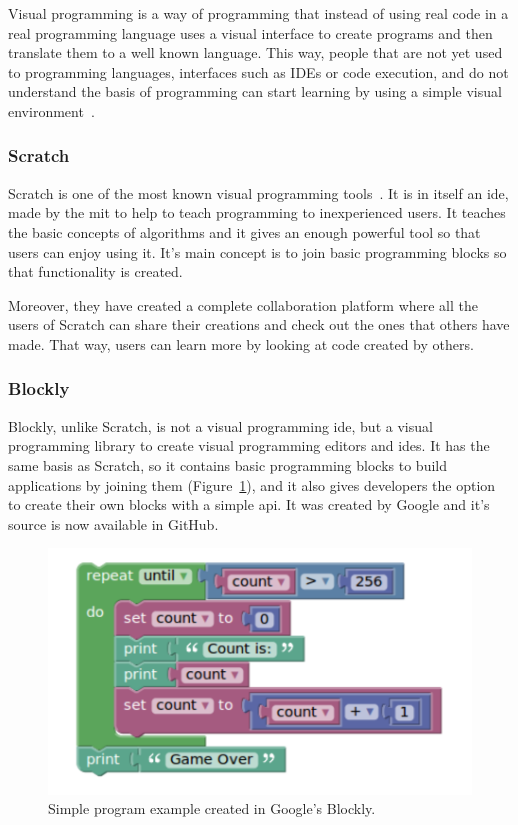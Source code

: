 Visual programming is a way of programming that instead of using real code in a real programming
language uses a visual interface to create programs and then translate them to a well known
language. This way, people that are not yet used to programming languages, interfaces such as IDEs
or code execution, and do not understand the basis of programming can start learning by using a
simple visual environment~\cite{visual_programming}.

\subsubsection{Scratch}

Scratch is one of the most known visual programming tools~\cite{scratch}. It is in itself an
\acrshort{ide}, made by the \acrshort{mit} to help to teach programming to inexperienced users. It
teaches the basic concepts of algorithms and it gives an enough powerful tool so that users can
enjoy using it. It's main concept is to join basic programming blocks so that functionality is
created.

Moreover, they have created a complete collaboration platform where all the users of Scratch can
share their creations and check out the ones that others have made. That way, users can learn more
by looking at code created by others.

\subsubsection{Blockly}

Blockly, unlike Scratch, is not a visual programming \acrshort{ide}, but a visual programming
library to create visual programming editors and \acrshort{ide}s. It has the same basis as Scratch,
so it contains basic programming blocks to build applications by joining them
(Figure~\ref{fig:blockly}), and it also gives developers the option to create their own blocks with
a simple \acrshort{api}. It was created by Google and it's source is now available in GitHub.

\begin{figure}[!htbp]
	\centering
	\includegraphics[width=.5\textwidth]{fig/blockly}
	\caption{Simple program example created in Google's Blockly.}\label{fig:blockly}
\end{figure}

